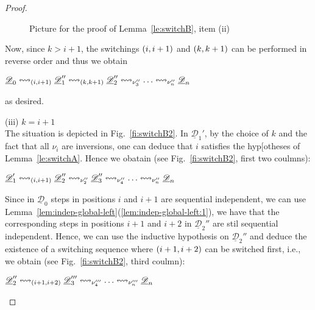 \documentclass[a4paper,UKenglish,cleveref,pdftex, thm-restate,numberwithinsect,anonymous]{lipics}
\newcommand{\dder}[1]{\mathscr{#1}}
\newcommand{\der}[1]{\underline{\dder{#1}}}
\newcommand{\shift}[1]{\ensuremath{\mathrel{{\leftrightsquigarrow}_{#1}}}}
\begin{document}
\begin{proof}
\begin{figure}
  \caption{Picture for the proof of Lemma~\ref{le:switchB}, item (ii)}
  \label{fi:switchB1}
\end{figure}

  
  Now, since $k>i+1$, the switchings $\transp{i}$ and $\transp{k}$ can
  be performed in reverse order and thus we obtain
  \begin{center}
    $\der{D}_0 \shift{\transp{i}} \der{D}_1'' \shift{\transp{k}}
    \der{D}_2'' \shift{\nu_3''} \ldots \shift{\nu_n''} \der{D}_n$
  \end{center}
  as desired.

  \bigskip
  \noindent
  (iii) $k = i+1$\\
  The situation is depicted in Fig.~\ref{fi:switchB2}. In
  $\der{D}_1'$, by the choice of $k$ and the fact that all $\nu_i$ are
  inversions, one can deduce that $i$ satisfies the hyp[otheses of
  Lemma~\ref{le:switchA}. Hence we obatain (see Fig.~\ref{fi:switchB2}, first two coulmns):
  \begin{center}
    $\der{D}_1' \shift{\transp{i}} \der{D}_2'' \shift{\nu_2''}
    \der{D}_3'' \shift{\nu_4''} \ldots \shift{\nu_n''} \der{D}_n$
  \end{center}

  Since in $\der{D}_0$ steps in positions $i$ and $i+1$ are sequential
  independent, we can use
  Lemma~\ref{lem:indep-global-left}(\ref{lem:indep-global-left:1}), we have that the corresponding steps in positions
  $i+1$ and $i+2$ in $\der{D}_2''$ are stil sequential
  independent. Hence, we can use the inductive hypothesis on
  $\der{D}_2''$ and deduce the existence of a switching sequence where
  $\transp{i+1}[i+2]$ can be switched first, i.e., we obtain (see
  Fig.~\ref{fi:switchB2}, third coulmn):
  \begin{center}
    $\der{D}_2'' \shift{\transp{i+1}[i+2]}
    \der{D}_3''' \shift{\nu_4'''} \ldots \shift{\nu_n'''} \der{D}_n$
  \end{center}
  

\end{proof}
\end{document}
